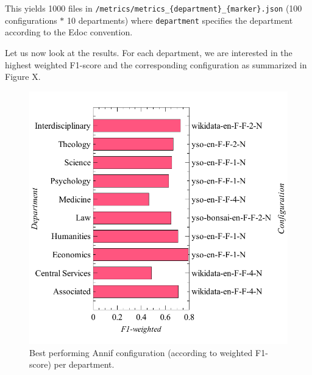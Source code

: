 \begin{Shaded}
\begin{Highlighting}[]
\OperatorTok{+} \OperatorTok{=}
\end{Highlighting}
\end{Shaded}

This yields 1000 files in
\texttt{/metrics/metrics\_\{department\}\_\{marker\}.json} (100
configurations \(*\) 10 departments) where \texttt{department} specifies
the department according to the Edoc convention.

Let us now look at the results. For each department, we are interested
in the highest weighted F1-score and the corresponding configuration as
summarized in Figure X.

\begin{figure}
\centering
\includegraphics{images/metrics_dept_summary.pdf}
\caption{Best performing Annif configuration (according to weighted
F1-score) per department.}
\end{figure}

